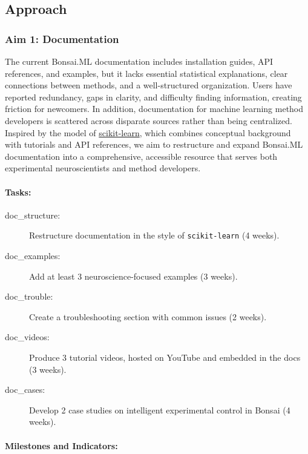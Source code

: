 
\subsection{Approach}

\subsubsection{Aim 1: Documentation}

The current Bonsai.ML documentation includes installation guides, API
references, and examples, but it lacks essential statistical explanations,
clear connections between methods, and a well-structured organization. Users
have reported redundancy, gaps in clarity, and difficulty finding information,
creating friction for newcomers. In addition, documentation for machine
learning method developers is scattered across disparate sources rather than
being centralized. Inspired by the model of
\href{https://scikit-learn.org/}{scikit-learn}, which combines conceptual
background with tutorials and API references, we aim to restructure and expand
Bonsai.ML documentation into a comprehensive, accessible resource that serves
both experimental neuroscientists and method developers.

\paragraph{Tasks:}  

\begin{description}
    \item[doc\_structure:] Restructure documentation in the style of \texttt{scikit-learn} (4 weeks).  
    \item[doc\_examples:] Add at least 3 neuroscience-focused examples (3 weeks).  
    \item[doc\_trouble:] Create a troubleshooting section with common issues (2 weeks).  
    \item[doc\_videos:] Produce 3 tutorial videos, hosted on YouTube and embedded in the docs (3 weeks).  
    \item[doc\_cases:] Develop 2 case studies on intelligent experimental control in Bonsai (4 weeks).  
\end{description}  

\paragraph{Milestones and Indicators:}  

